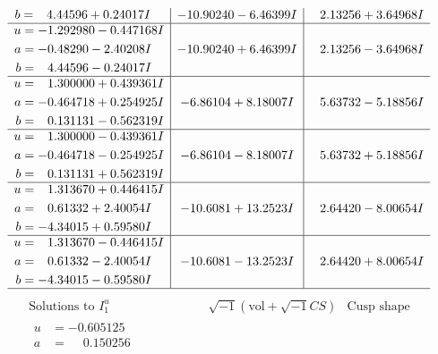 \documentclass[1p]{elsarticle_modified}
\theoremstyle{definition}
\newcommand{\I}{\sqrt{-1}}
\begin{document}
$$\begin{array}{c|c|c}
\begin{aligned}
b &= \phantom{-}4.44596 + 0.24017 I\end{aligned}
 & -10.90240 - 6.46399 I & \phantom{-}2.13256 + 3.64968 I \\ \hline\begin{aligned}
u &= -1.292980 - 0.447168 I \\
a &= -0.48290 - 2.40208 I \\
b &= \phantom{-}4.44596 - 0.24017 I\end{aligned}
 & -10.90240 + 6.46399 I & \phantom{-}2.13256 - 3.64968 I \\ \hline\begin{aligned}
u &= \phantom{-}1.300000 + 0.439361 I \\
a &= -0.464718 + 0.254925 I \\
b &= \phantom{-}0.131131 - 0.562319 I\end{aligned}
 & -6.86104 + 8.18007 I & \phantom{-}5.63732 - 5.18856 I \\ \hline\begin{aligned}
u &= \phantom{-}1.300000 - 0.439361 I \\
a &= -0.464718 - 0.254925 I \\
b &= \phantom{-}0.131131 + 0.562319 I\end{aligned}
 & -6.86104 - 8.18007 I & \phantom{-}5.63732 + 5.18856 I \\ \hline\begin{aligned}
u &= \phantom{-}1.313670 + 0.446415 I \\
a &= \phantom{-}0.61332 + 2.40054 I \\
b &= -4.34015 + 0.59580 I\end{aligned}
 & -10.6081 + 13.2523 I & \phantom{-}2.64420 - 8.00654 I \\ \hline\begin{aligned}
u &= \phantom{-}1.313670 - 0.446415 I \\
a &= \phantom{-}0.61332 - 2.40054 I \\
b &= -4.34015 - 0.59580 I\end{aligned}
 & -10.6081 - 13.2523 I & \phantom{-}2.64420 + 8.00654 I\\
 \hline 
 \end{array}$$\newpage$$\begin{array}{c|c|c}  
\text{Solutions to }I^u_{1}& \I (\text{vol} + \sqrt{-1}CS) & \text{Cusp shape}\\
 \hline 
\begin{aligned}
u &= -0.605125\phantom{ +0.000000I} \\
a &= \phantom{-}0.150256\phantom{ +0.000000I} \\

\end{aligned}
\end{array}$$
\end{document}
